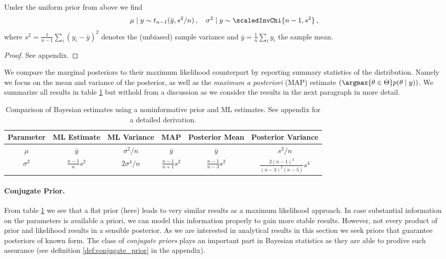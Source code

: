 \begin{proposition}\label{prop:posterior_uniform}
  Under the uniform prior from above we find
  \begin{align*}
    \mu \mid y \sim t_{n-1}(\bar{y}, s^2/n) \,, \quad \sigma^2 \mid y \sim \scaledInvChi{n-1, s^2} \,,
  \end{align*}
  where $s^2 = \frac{1}{n-1} \sum_i (y_i - \bar{y})^2$ denotes the (unbiased) sample variance and $\bar{y} = \frac{1}{n} \sum_i y_i$ the sample mean.
\end{proposition}
\begin{proof}
See appendix.
\end{proof}

We compare the marginal posteriors to their maximum likelihood counterpart by reporting summary statistics of the distribution.
Namely we focus on the mean and variance of the posterior, as well as the \emph{maximum a posteriori} (MAP) estimate $\left(\argmax{\theta \in \Theta} p(\theta \mid y)\right)$.
We summarize all results in table \ref{tab:comp_uniform_bay_ml} but withold from a discussion as we consider the results in the next paragraph in more detail.

\begin{table}[ht]
\centering
\def\arraystretch{1.3}
{\small
 \begin{tabular}{c | c c c c c}
 Parameter & ML Estimate & ML Variance & MAP & Posterior Mean & Posterior Variance\\[0.5ex]
 \hline
 $\mu$ & $\bar{y}$ & $\sigma^2/n$ & $\bar{y}$ & $\bar{y}$ & $s^2 / n$\\
 $\sigma^2$ & $\frac{n-1}{n} s^2$ & $2 \sigma^4 /n$ & $\frac{n-1}{n+1} s^2$ & $\frac{n-1}{n-3} s^2$ & $\frac{2 (n-1)^2}{(n-3)^2 (n-5)} s^4$\\
 \end{tabular}
 }
\caption{\small {Comparison of Bayesian estimates using a noninformative prior and ML estimates. See appendix for a detailed derivation.}}
\label{tab:comp_uniform_bay_ml}
\end{table}


\paragraph{Conjugate Prior.}
From table \ref{tab:comp_uniform_bay_ml} we see that a flat prior (here) leads to very similar results as a maximum likelihood approach.
In case substantial information on the parameters is available a priori, we can model this information properly to gain more stable results.
However, not every product of prior and likelihood results in a sensible posterior.
As we are interested in analytical results in this section we seek priors that guarantee posteriors of known form.
The class of \emph{conjugate priors} plays an important part in Bayesian statistics as they are able to prodive such assurance (see definition \ref{def:conjugate_prior} in the appendix).

